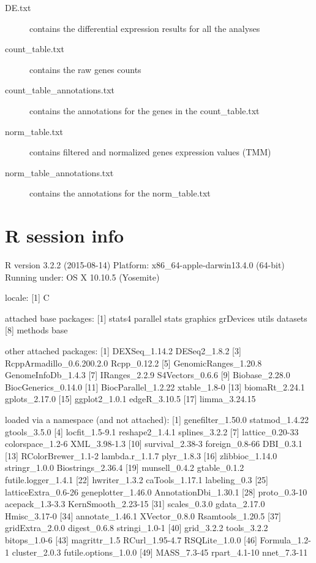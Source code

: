 \documentclass[12pt]{article}
\begin{document}
\begin{description}
  \item[DE.txt] contains the differential expression results for all the analyses
  \item[count\_table.txt] contains the raw genes counts
  \item[count\_table\_annotations.txt] contains the annotations for the genes in the count\_table.txt
  \item[norm\_table.txt] contains filtered and normalized genes expression values (TMM)
  \item[norm\_table\_annotations.txt] contains the annotations for the norm\_table.txt
\end{description}

\section{R session info}
\label{sessionInfo}
\begin{Schunk}
\begin{Soutput}
R version 3.2.2 (2015-08-14)
Platform: x86_64-apple-darwin13.4.0 (64-bit)
Running under: OS X 10.10.5 (Yosemite)

locale:
[1] C

attached base packages:
[1] stats4    parallel  stats     graphics  grDevices utils     datasets 
[8] methods   base     

other attached packages:
 [1] DEXSeq_1.14.2             DESeq2_1.8.2             
 [3] RcppArmadillo_0.6.200.2.0 Rcpp_0.12.2              
 [5] GenomicRanges_1.20.8      GenomeInfoDb_1.4.3       
 [7] IRanges_2.2.9             S4Vectors_0.6.6          
 [9] Biobase_2.28.0            BiocGenerics_0.14.0      
[11] BiocParallel_1.2.22       xtable_1.8-0             
[13] biomaRt_2.24.1            gplots_2.17.0            
[15] ggplot2_1.0.1             edgeR_3.10.5             
[17] limma_3.24.15            

loaded via a namespace (and not attached):
 [1] genefilter_1.50.0    statmod_1.4.22       gtools_3.5.0        
 [4] locfit_1.5-9.1       reshape2_1.4.1       splines_3.2.2       
 [7] lattice_0.20-33      colorspace_1.2-6     XML_3.98-1.3        
[10] survival_2.38-3      foreign_0.8-66       DBI_0.3.1           
[13] RColorBrewer_1.1-2   lambda.r_1.1.7       plyr_1.8.3          
[16] zlibbioc_1.14.0      stringr_1.0.0        Biostrings_2.36.4   
[19] munsell_0.4.2        gtable_0.1.2         futile.logger_1.4.1 
[22] hwriter_1.3.2        caTools_1.17.1       labeling_0.3        
[25] latticeExtra_0.6-26  geneplotter_1.46.0   AnnotationDbi_1.30.1
[28] proto_0.3-10         acepack_1.3-3.3      KernSmooth_2.23-15  
[31] scales_0.3.0         gdata_2.17.0         Hmisc_3.17-0        
[34] annotate_1.46.1      XVector_0.8.0        Rsamtools_1.20.5    
[37] gridExtra_2.0.0      digest_0.6.8         stringi_1.0-1       
[40] grid_3.2.2           tools_3.2.2          bitops_1.0-6        
[43] magrittr_1.5         RCurl_1.95-4.7       RSQLite_1.0.0       
[46] Formula_1.2-1        cluster_2.0.3        futile.options_1.0.0
[49] MASS_7.3-45          rpart_4.1-10         nnet_7.3-11         
\end{Soutput}
\end{Schunk}
\end{document}
